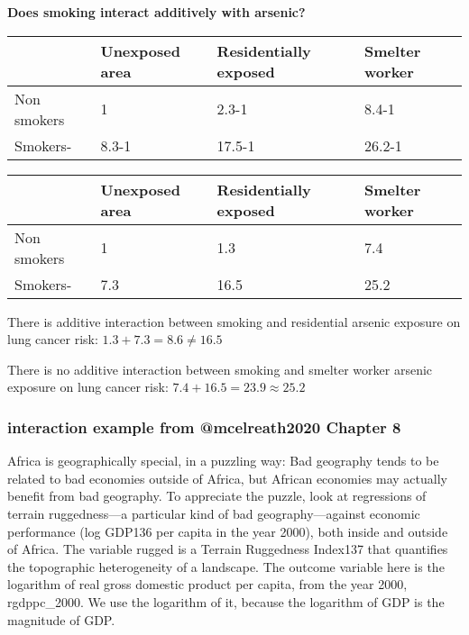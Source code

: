 \documentclass[
]{article}
\begin{document}
\textbf{Does smoking interact additively with arsenic?}

\begin{longtable}[]{@{}llll@{}}
\toprule
& Unexposed area & Residentially exposed & Smelter worker\tabularnewline
\midrule
\endhead
Non smokers & 1 & 2.3-1 & 8.4-1\tabularnewline
Smokers- & 8.3-1 & 17.5-1 & 26.2-1\tabularnewline
\bottomrule
\end{longtable}

\begin{longtable}[]{@{}llll@{}}
\toprule
& Unexposed area & Residentially exposed & Smelter worker\tabularnewline
\midrule
\endhead
Non smokers & 1 & 1.3 & 7.4\tabularnewline
Smokers- & 7.3 & 16.5 & 25.2\tabularnewline
\bottomrule
\end{longtable}

There is additive interaction between smoking and residential arsenic
exposure on lung cancer risk: \(1.3 + 7.3 = 8.6 \ne 16.5\)

There is no additive interaction between smoking and smelter worker
arsenic exposure on lung cancer risk: \(7.4 + 16.5 = 23.9 \approx 25.2\)

\hypertarget{interaction-example-from-mcelreath2020-chapter-8}{%
\subsubsection{interaction example from @mcelreath2020 Chapter
8}\label{interaction-example-from-mcelreath2020-chapter-8}}

Africa is geographically special, in a puzzling way: Bad geography tends
to be related to bad economies outside of Africa, but African economies
may actually benefit from bad geography. To appreciate the puzzle, look
at regressions of terrain ruggedness---a particular kind of bad
geography---against economic performance (log GDP136 per capita in the
year 2000), both inside and outside of Africa. The variable rugged is a
Terrain Ruggedness Index137 that quantifies the topographic
heterogeneity of a landscape. The outcome variable here is the logarithm
of real gross domestic product per capita, from the year 2000,
rgdppc\_2000. We use the logarithm of it, because the logarithm of GDP
is the magnitude of GDP.
\end{document}

